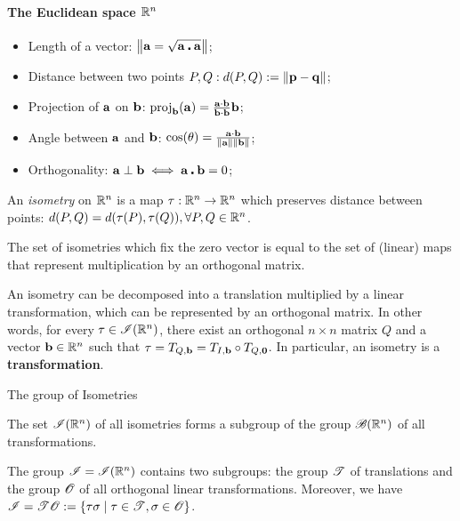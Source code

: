 \paragraph{The Euclidean space \(\mathbb{R}^n\)}
\begin{itemize}
    \item Length of a vector: \(\norm{\mathbf{a} = \sqrt{\mathbf{a \centerdot a}}}\);
    \item Distance between two points \(P, Q: d(P, Q) := \norm{\mathbf{p - q}}\);
    \item Projection of \(\mathbf{a}\) on \(\mathbf{b}\): \(\operatorname{proj}_{\mathbf{b}}(\mathbf{a}) = \frac{\mathbf{a} \cdot \mathbf{b}}{\mathbf{b} \cdot \mathbf{b}} \mathbf{b}\);
    \item Angle between \(\mathbf{a}\) and \(\mathbf{b}\): \(\cos(\theta) = \frac{\mathbf{a} \cdot \mathbf{b}}{\norm{\mathbf{a}}\norm{\mathbf{b}}}\);
    \item Orthogonality: \(\mathbf{a} \perp \mathbf{b} \iff \mathbf{a} \centerdot \mathbf{b} = 0\);
\end{itemize}

\begin{definition}
    An \textit{isometry} on \(\mathbb{R}^n\) is a map \(\tau : \mathbb{R}^n \to \mathbb{R}^n\) which preserves distance between points: \(d(P, Q) = d(\tau(P), \tau(Q)), \forall P, Q \in \mathbb{R}^n\).
\end{definition}

\begin{lemma}
    The set of isometries which fix the zero vector is equal to the set of (linear) maps that represent multiplication by an orthogonal matrix.
\end{lemma}

\begin{theorem}
    An isometry can be decomposed into a translation multiplied by a linear transformation, which can be represented by an orthogonal matrix. In other words, for every \(\tau \in \mathscr{I}(\mathbb{R}^n)\), there exist an orthogonal \(n \times n\) matrix \(Q\) and a vector \(\mathbf{b} \in \mathbb{R}^n\) such that \(\tau = T_{Q, \mathbf{b}} = T_{I, \mathbf{b}} \circ T_{Q, \mathbf{0}}\). In particular, an isometry is a \textbf{transformation}.
\end{theorem}

\begin{theorem}
    The group of Isometries
    \begin{statements}{}
        \item The set \(\mathscr{I}(\mathbb{R}^n)\) of all isometries forms a subgroup of the group \(\mathscr{B}(\mathbb{R}^n)\) of all transformations.
        \item The group \(\mathscr{I} = \mathscr{I}(\mathbb{R}^n)\) contains two subgroups: the group \(\mathscr{T}\) of translations and the group \(\mathscr{O}\) of all orthogonal linear transformations. Moreover, we have \(\mathscr{I} = \mathscr{T}\mathscr{O} := \{\tau \sigma \mid \tau \in \mathscr{T}, \sigma \in \mathscr{O} \}\).
    \end{statements}
\end{theorem}

\newpage